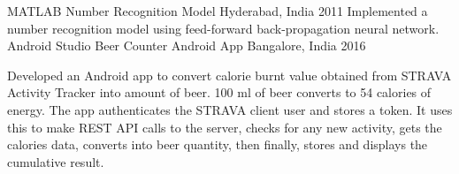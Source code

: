 \begin{cventries}   
  \cventry
    {MATLAB}
    {Number Recognition Model }
    {Hyderabad, India}
    {2011}
    {
        Implemented a number recognition model using feed-forward back-propagation neural network.
    }
    \cventry
    {Android Studio}
    {Beer Counter Android App}
    {Bangalore, India}
    {2016}
    {
    \begin{cvitems}
        \item 
        {
    Developed an Android app to convert calorie burnt value obtained from STRAVA Activity Tracker into amount of beer. 100 ml of beer converts to 54 calories of energy. The app authenticates the STRAVA client user and stores a token. It uses this to make REST API calls to the server, checks for any new activity, gets the calories data, converts into beer quantity, then finally, stores and displays the cumulative result.
    }
    \end{cvitems}
    }
        
\end{cventries}